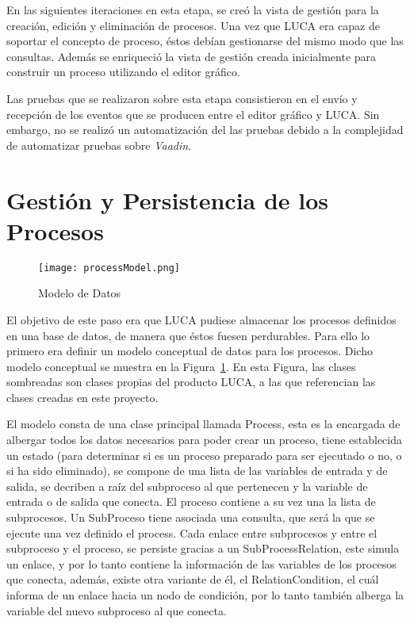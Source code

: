 En las siguientes iteraciones en esta etapa, se creó la vista de gestión para la creación, edición y eliminación de procesos. Una vez que LUCA era capaz de soportar el concepto de proceso, éstos debían gestionarse del mismo modo que las consultas. Además se enriqueció la vista de gestión creada inicialmente para construir un proceso utilizando el editor gráfico.

Las pruebas que se realizaron sobre esta etapa consistieron en el envío y recepción de los eventos que se producen entre el editor gráfico y LUCA. Sin embargo, no se realizó un automatización del las pruebas debido a la complejidad de automatizar pruebas sobre \emph{Vaadin}.

\section{Gestión y Persistencia de los Procesos}

\begin{figure}[H]
	\centering
	\texttt{[image: processModel.png]}
	\caption{Modelo de Datos}
	\label{fig:processModel}
\end{figure}

El objetivo de este paso era que LUCA pudiese almacenar los procesos definidos en una base de datos, de manera que éstos fuesen perdurables. Para ello lo primero era definir un modelo conceptual de datos para los procesos. Dicho modelo conceptual se muestra en la Figura~\ref{fig:processModel}. En esta Figura, las clases sombreadas son clases propias del producto LUCA, a las que referencian las clases creadas  en este proyecto.

El modelo consta de una clase principal llamada Process, esta es la encargada de albergar todos los datos necesarios para poder crear un proceso, tiene establecida un estado (para determinar si es un proceso preparado para ser ejecutado o no, o si ha sido eliminado), se compone de una lista de las variables de entrada y de salida, se decriben a raíz del subproceso al que pertenecen y la variable de entrada o de salida que conecta. El proceso contiene a su vez una la lista de subprocesos. Un SubProceso tiene asociada una consulta, que será la que se ejecute una vez definido el process. Cada enlace entre subprocesos y entre el subproceso y el proceso, se persiste gracias a un SubProcessRelation, este simula un enlace, y por lo tanto contiene la información de las variables de los procesos que conecta, además, existe otra variante de él, el RelationCondition, el cuál informa de un enlace hacia un nodo de condición, por lo tanto también alberga la variable del nuevo subproceso al que conecta.


